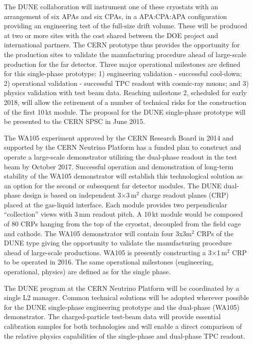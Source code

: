 The DUNE collaboration will instrument one of these cryostats with an arrangement 
of six APAs and six CPAs, in a APA:CPA:APA configuration providing an engineering 
test of the full-size drift volume. These will be produced at two or more sites with the cost 
shared between the DOE project and international partners. The CERN prototype thus 
provides the opportunity for the production sites to validate the manufacturing 
procedure ahead of large-scale production for the far detector. Three major operational 
milestones are defined for this single-phase prototype: 1) engineering validation 
- successful cool-down; 2) operational validation - successful TPC readout with 
cosmic-ray muons; and 3) physics validation with test beam data. Reaching milestone 
2, scheduled for early 2018, will allow the retirement of a number of technical 
risks for the construction of the first 10\,kt module. The proposal for the DUNE 
single-phase prototype will be presented to the CERN SPSC in June 2015. 

The WA105 experiment approved by the CERN Research Board in 2014 and supported 
by the CERN Neutrino Platform has a funded plan to construct and operate a large-scale 
demonstrator utilizing the dual-phase readout in the test beam by October 2017. 
Successful operation and demonstration of long-term stability of the WA105 demonstrator 
will establish this technological solution as an option for the second or subsequent 
far detector modules. The DUNE dual-phase design is based on independent 3$\times$3\,m$^2$
charge readout planes (CRP) placed at the gas-liquid interface. Each module provides 
two perpendicular ``collection'' views with 3\,mm readout pitch. A 10\,kt module 
would be composed of 80 CRPs hanging from the top of the cryostat, decoupled from 
the field cage and cathode. The WA105 demonstrator will contain four 3x3m$^2$ 
CRPs of the DUNE type giving the opportunity to validate the manufacturing procedure 
ahead of large-scale productions. WA105 is presently constructing a 3$\times$1\,m$^2$ 
CRP to be operated in 2016. The same operational milestones (engineering, operational, 
physics) are defined as for the single phase.

The DUNE program at the CERN Neutrino Platform will be coordinated by a single 
L2 manager. Common technical solutions will be adopted wherever possible for the 
DUNE single-phase engineering prototype and the dual-phase (WA105) demonstrator. 
The charged-particle test-beam data will provide essential calibration samples 
for both technologies and will enable a direct comparison of the relative physics 
capabilities of the single-phase and dual-phase TPC readout. 

